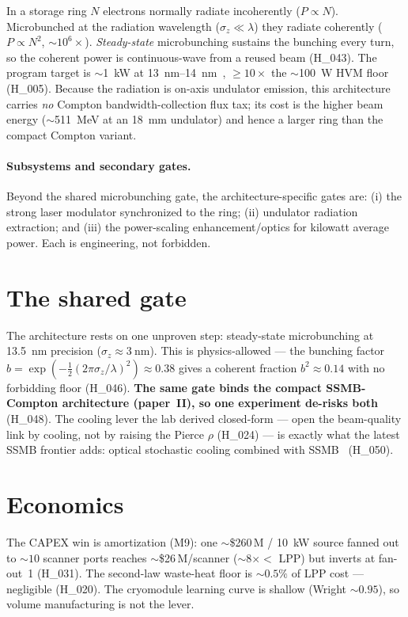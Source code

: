 \documentclass[11pt,a4paper]{article}
\newcommand{\hyp}[1]{\textcolor{blue!45!black}{\textsf{\small #1}}}
\begin{document}
In a storage ring $N$ electrons normally radiate incoherently ($P\!\propto\!N$). Microbunched at the
radiation wavelength ($\sigma_z\!\ll\!\lambda$) they radiate coherently ($P\!\propto\!N^{2}$,
$\sim\!10^{6}\times$). \emph{Steady-state} microbunching sustains the bunching every turn, so the
coherent power is continuous-wave from a reused beam (\hyp{H\_043}). The program target is
$\sim$\SI{1}{\kilo\watt} at \SIrange{13}{14}{\nano\meter}~\citep{deng2022}, $\geq\!10\times$ the
$\sim$\SI{100}{\watt} HVM floor (\hyp{H\_005}). Because the radiation is on-axis undulator emission,
this architecture carries \emph{no} Compton bandwidth-collection flux tax; its cost is the higher
beam energy ($\sim$\SI{511}{\mega\electronvolt} at an \SI{18}{\milli\meter} undulator) and hence a
larger ring than the compact Compton variant.

\paragraph{Subsystems and secondary gates.} Beyond the shared microbunching gate, the
architecture-specific gates are: (i) the strong laser modulator synchronized to the ring; (ii)
undulator radiation extraction; and (iii) the power-scaling enhancement/optics for kilowatt
average power. Each is engineering, not forbidden.

\section{The shared gate}
\label{sec:gate}
The architecture rests on one unproven step: steady-state microbunching at \SI{13.5}{\nano\meter}
precision ($\sigma_z\!\approx\!\SI{3}{\nano\meter}$). This is physics-allowed --- the bunching factor
$b=\exp(-\tfrac{1}{2}(2\pi\sigma_z/\lambda)^2)\approx0.38$ gives a coherent fraction $b^2\approx0.14$
with no forbidding floor (\hyp{H\_046}). \textbf{The same gate binds the compact SSMB-Compton
architecture (paper~II), so one experiment de-risks both} (\hyp{H\_048}). The cooling lever the lab
derived closed-form --- open the beam-quality link by cooling, not by raising the Pierce $\rho$
(\hyp{H\_024}) --- is exactly what the latest SSMB frontier adds: optical stochastic cooling combined
with SSMB~\citep{deng2025} (\hyp{H\_050}).

\section{Economics}
The CAPEX win is amortization (M9): one $\sim$\$260\,M / \SI{10}{\kilo\watt} source fanned out to
$\sim\!10$ scanner ports reaches $\sim$\$26\,M/scanner ($\sim\!8\times<$ LPP) but inverts at fan-out~1
(\hyp{H\_031}). The second-law waste-heat floor is $\sim\!0.5\%$ of LPP cost --- negligible
(\hyp{H\_020}). The cryomodule learning curve is shallow (Wright $\sim\!0.95$), so volume
manufacturing is not the lever.
\end{document}
